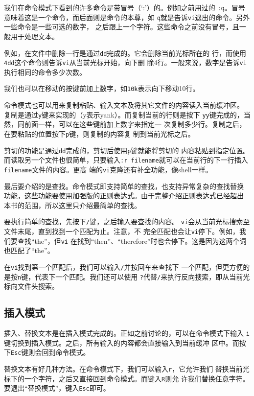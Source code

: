 我们在命令模式下看到的许多命令是带冒号（`:'）的。例如之前用过的
\texttt{:q}。冒号意味着这是一个命令，而后面则是命令的本尊，如
\texttt{q}就是告诉\texttt{vi}退出的命令。另外一些命令是一些可选的数字，
之后跟上一个字符。这些命令之前没有冒号，且一般用于处理文本。

例如，在文件中删除一行是通过\texttt{dd}完成的。它会删除当前光标所在的
行，而使用\texttt{4dd}这个命令则告诉\texttt{vi}从当前光标开始，向下删
除4行。一般来说，数字是告诉\texttt{vi}执行相同的命令多少次数。

我们也可以在移动的按键前加上数字，如\texttt{10k}表示向下移动10行。

命令模式也可以用来复制粘贴、输入文本及将其它文件的内容读入当前缓冲区。
复制是通过\texttt{y}键来实现的（y表示yank）。而复制当前的行则是按下
\texttt{yy}键完成的，当然，同前面一样，可以在这些键前加上数字来指定一
次复制多少行。复制之后，在要粘贴的位置按下\texttt{p}键，则复制的内容复
制到当前光标之后。

剪切的功能是通过\texttt{dd}完成的，剪切后使用\texttt{p}键就能将剪切的
内容粘贴到指定位置。而读取另一个文件也很简单，只要输入\texttt{:r
  filename}就可以在当前行的下一行插入\texttt{filename}文件的内容。更高
端的\texttt{vi}克隆还有补全功能，像shell一样。

最后要介绍的是查找。命令模式即支持简单的查找，也支持异常复杂的查找替换
功能，这些功能要使用加强版的正则表达式。由于完整介绍正则表达式已经超出
本书的范围，所以这里只介绍最简单的查找。

要执行简单的查找，先按下\texttt{/}键，之后输入要查找的内容。
\texttt{vi}会从当前光标搜索至文件末尾，直到找到一个匹配为止。注意，不
完全匹配也会让\texttt{vi}停下。例如，我们要查找``the''，但\texttt{vi}
在找到``then''、``therefore''时也会停下。这是因为这两个词也匹配了``the''。

在\texttt{vi}找到第一个匹配后，我们可以输入\texttt{/}并按回车来查找下
一个匹配，但更方便的是按\texttt{n}键，代表下一个匹配。我们还可以使用
\texttt{?}代替\texttt{/}来执行反向搜索，即从当前光标向文件头搜索。

\subsection{插入模式}
\label{sec:vi:modes:insert}
插入、替换文本是在插入模式完成的。正如之前讨论的，可以在命令模式下输入
\texttt{i}键切换到插入模式。之后，所有输入的内容都会直接输入到当前缓冲
区中。而按下\texttt{Esc}键则会回到命令模式。

替换文本有好几种方法。在命令模式下，我们可以输入\texttt{r}，它允许我们
替换当前光标下的一个字符，之后又直接回到命令模式。而键入\texttt{R}则允
许我们替换任意字符。要退出``替换模式''，键入\texttt{Esc}即可。

